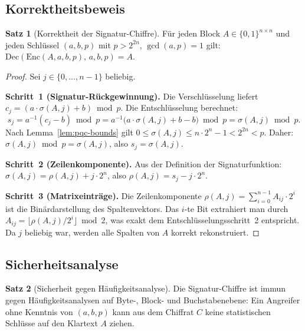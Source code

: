 ﻿\documentclass[a4paper,12pt]{article}
\theoremstyle{definition}
\newtheorem{satz}{Satz}[section]
\begin{document}
\subsection{Korrektheitsbeweis}

\begin{satz}[Korrektheit der Signatur-Chiffre]
\label{satz:pqc-korrekt}
Für jeden Block $A \in \{0,1\}^{n \times n}$ und jeden Schlüssel $(a,b,p)$
mit $p > 2^{2n}$, $\gcd(a,p) = 1$ gilt:
$\mathrm{Dec}(\mathrm{Enc}(A, a, b, p),\, a, b, p) = A.$
\end{satz}

\begin{proof}
Sei $j \in \{0,\ldots,n-1\}$ beliebig.

\textbf{Schritt~1 (Signatur-Rückgewinnung).}
Die Verschlüsselung liefert $c_j = (a \cdot \sigma(A,j) + b) \bmod p$.
Die Entschlüsselung berechnet:
\[
  s_j = a^{-1}(c_j - b) \bmod p
      = a^{-1}\bigl(a \cdot \sigma(A,j) + b - b\bigr) \bmod p
      = \sigma(A,j) \bmod p.
\]
Nach Lemma~\ref{lem:pqc-bounds} gilt $0 \leq \sigma(A,j) \leq n \cdot 2^n - 1 < 2^{2n} < p$.
Daher: $\sigma(A,j) \bmod p = \sigma(A,j)$, also $s_j = \sigma(A,j)$.

\textbf{Schritt~2 (Zeilenkomponente).}
Aus der Definition der Signaturfunktion: $\sigma(A,j) = \rho(A,j) + j \cdot 2^n$,
also $\rho(A,j) = s_j - j \cdot 2^n$.

\textbf{Schritt~3 (Matrixeinträge).}
Die Zeilenkomponente $\rho(A,j) = \sum_{i=0}^{n-1} A_{ij} \cdot 2^i$ ist die
Binärdarstellung des Spaltenvektors. Das $i$-te Bit extrahiert man durch
$A_{ij} = \lfloor \rho(A,j) / 2^i \rfloor \bmod 2$, was exakt dem
Entschlüsselungsschritt~2 entspricht.
Da $j$ beliebig war, werden alle Spalten von $A$ korrekt rekonstruiert.
\end{proof}

\subsection{Sicherheitsanalyse}

\begin{satz}[Sicherheit gegen Häufigkeitsanalyse]
\label{satz:pqc-freq}
Die Signatur-Chiffre ist immun gegen Häufigkeitsanalysen auf Byte-, Block- und
Buchstabenebene: Ein Angreifer ohne Kenntnis von $(a, b, p)$ kann aus dem
Chiffrat $C$ keine statistischen Schlüsse auf den Klartext $A$ ziehen.
\end{satz}
\end{document}
